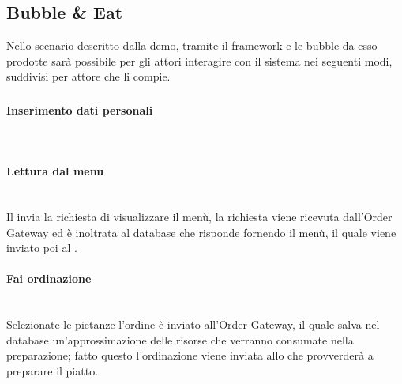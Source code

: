 \subsection{Bubble \& Eat}
Nello scenario descritto dalla demo, tramite il framework e le bubble da esso prodotte sarà possibile per gli attori interagire con il sistema nei seguenti modi, suddivisi per attore che li compie.

\subsubsection{\Customer{}}

\paragraph{Inserimento dati personali}\mbox{}\\

\paragraph{Lettura dal menu}\mbox{}\\
Il \Customer{} invia la richiesta di visualizzare il menù, la richiesta viene ricevuta dall'Order Gateway ed è inoltrata al database che risponde fornendo il menù, il quale viene inviato poi al \Customer{}.

\paragraph{Fai ordinazione}\mbox{}\\
Selezionate le pietanze l'ordine è inviato all'Order Gateway, il quale salva nel database un'approssimazione delle risorse che verranno consumate nella preparazione; fatto questo l'ordinazione viene inviata allo \Chef{} che provverderà a preparare il piatto.

